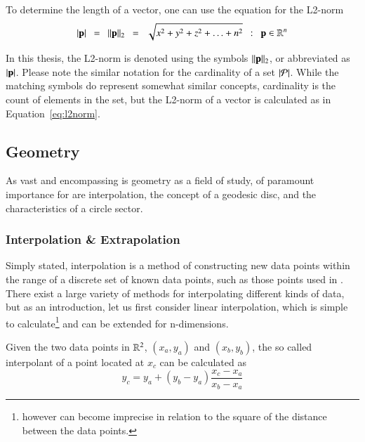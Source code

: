 To determine the length of a vector, one can use the equation for the L2-norm
\begin{equation}
	|\mathbf{p}| \enspace=\enspace \|\mathbf{p}\|_2 \enspace=\enspace \sqrt{x^2 + y^2 + z^2 + \ldots + n^2} \enspace:\enspace \mathbf{p} \in \mathbb{R}^{n}
	\label{eq:l2norm}
\end{equation}

In this thesis, the L2-norm is denoted using the symbols $\|\mathbf{p}\|_2$, or abbreviated as $|\mathbf{p}|$. Please note the similar notation for the cardinality of a set $|\mathcal{P}|$. While the matching symbols do represent somewhat similar concepts, cardinality is the count of elements in the set, but the L2-norm of a vector is calculated as in Equation~\ref{eq:l2norm}.~\cite[p.~26]{Mara12}

%
%
%
\subsection{Geometry}
As vast and encompassing is geometry as a field of study, of paramount importance for  are interpolation, the concept of a geodesic disc, and the characteristics of a circle sector.

%
\subsubsection{Interpolation \& Extrapolation}
Simply stated, interpolation is a method of constructing new data points within the range of a discrete set of known data points, such as those points used in \tdd{}. There exist a large variety of methods for interpolating different kinds of data, but as an introduction, let us first consider linear interpolation, which is simple to calculate\footnote{however can become imprecise in relation to the square of the distance between the data points.} and can be extended for n-dimensions.

Given the two data points in $\mathbb{R}^{2}$, $(x_a, y_a)$ and $(x_b, y_b)$, the so called interpolant of a point located at $x_c$ can be calculated as
%
\begin{equation}
	y_c = y_a + (y_b - y_a) \frac{x_c - x_a}{x_b - x_a}
	\label{eq:interpolationGeneral}
\end{equation}

